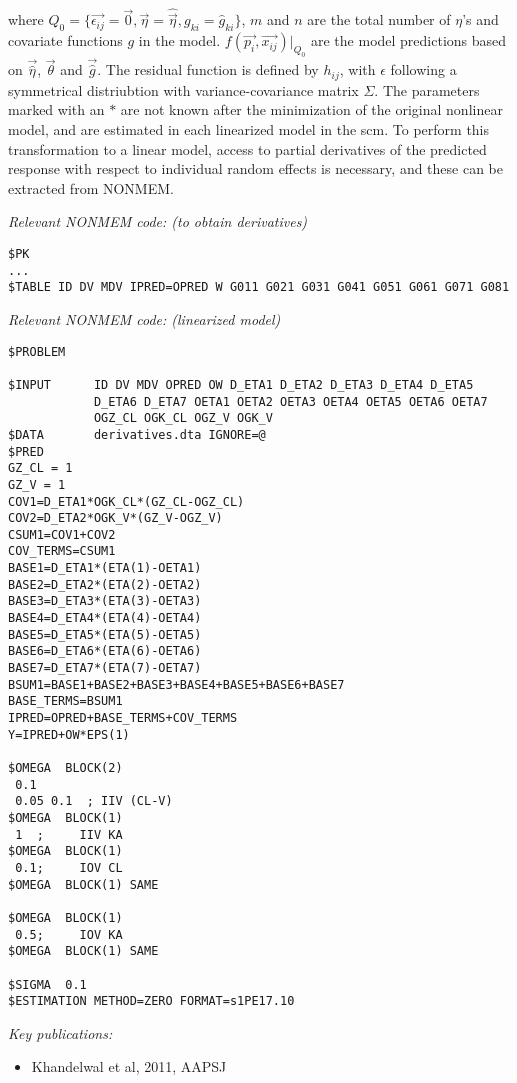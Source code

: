 \documentclass[a4paper,11pt]{article}
\begin{document}
\noindent where $Q_0 = \{\vec{\epsilon_{ij}} = \vec{0}, \vec{\eta} =
\hat{\vec{\eta}}, g_{ki} = \hat{g}_{ki} \} $, $m$ and $n$ are the
total number of $\eta$'s and covariate functions $g$ in the model.
$f(\vec{p_i}, \vec{x_{ij}}) |_{Q_0} $ are the model predictions based
on $\vec{\hat{\eta}}$, $\vec{\theta}$ and $\vec{\hat{g}}$. The
residual function is defined by $h_{ij}$, with $\epsilon$ following a
symmetrical distriubtion with variance-covariance matrix $\Sigma$.
The parameters marked with an $*$ are not known after the minimization
of the original nonlinear model, and are estimated in each linearized
model in the scm. To perform this transformation to a linear model,
access to partial derivatives of the predicted response with respect
to individual random effects is necessary, and these can be extracted
from NONMEM.

\vspace{10pt}

\noindent \emph{Relevant NONMEM code: (to obtain derivatives)}
\begin{lstlisting}
$PK
...
$TABLE ID DV MDV IPRED=OPRED W G011 G021 G031 G041 G051 G061 G071 G081
\end{lstlisting}

\noindent \emph{Relevant NONMEM code: (linearized model)}
\begin{lstlisting}
$PROBLEM

$INPUT      ID DV MDV OPRED OW D_ETA1 D_ETA2 D_ETA3 D_ETA4 D_ETA5
            D_ETA6 D_ETA7 OETA1 OETA2 OETA3 OETA4 OETA5 OETA6 OETA7
            OGZ_CL OGK_CL OGZ_V OGK_V
$DATA       derivatives.dta IGNORE=@
$PRED
GZ_CL = 1
GZ_V = 1
COV1=D_ETA1*OGK_CL*(GZ_CL-OGZ_CL)
COV2=D_ETA2*OGK_V*(GZ_V-OGZ_V)
CSUM1=COV1+COV2
COV_TERMS=CSUM1
BASE1=D_ETA1*(ETA(1)-OETA1)
BASE2=D_ETA2*(ETA(2)-OETA2)
BASE3=D_ETA3*(ETA(3)-OETA3)
BASE4=D_ETA4*(ETA(4)-OETA4)
BASE5=D_ETA5*(ETA(5)-OETA5)
BASE6=D_ETA6*(ETA(6)-OETA6)
BASE7=D_ETA7*(ETA(7)-OETA7)
BSUM1=BASE1+BASE2+BASE3+BASE4+BASE5+BASE6+BASE7
BASE_TERMS=BSUM1
IPRED=OPRED+BASE_TERMS+COV_TERMS
Y=IPRED+OW*EPS(1)

$OMEGA  BLOCK(2)
 0.1
 0.05 0.1  ; IIV (CL-V)
$OMEGA  BLOCK(1)
 1  ;     IIV KA
$OMEGA  BLOCK(1)
 0.1;     IOV CL
$OMEGA  BLOCK(1) SAME

$OMEGA  BLOCK(1)
 0.5;     IOV KA
$OMEGA  BLOCK(1) SAME

$SIGMA  0.1
$ESTIMATION METHOD=ZERO FORMAT=s1PE17.10
\end{lstlisting}

\noindent \emph{Key publications:}
\begin{itemize}
\item Khandelwal et al, 2011, AAPSJ
\end{itemize}
\end{document}
